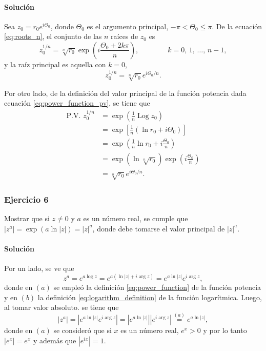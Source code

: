 \documentclass[a4paper]{report}
\DeclareMathOperator{\Log}{Log}
\begin{document}
\paragraph{Solución} Sea \(z_0=r_0e^{i\Theta_0}\), donde \(\Theta_0\) es el argumento principal, \(-\pi<\Theta_0\leq\pi\). De la ecuación \ref{eq:roots_n}, el conjunto de las \(n\) raíces de \(z_0\) es
\[
 z_0^{1/n}=\sqrt[n]{r_0}\exp\left(i\frac{\Theta_0+2k\pi}{n}\right),
 \qquad\qquad k=0,\,1,\,\dots,\,n-1,
\]
y la raíz principal es aquella con \(k=0\),
\[
 z_0^{1/n}=\sqrt[n]{r_0}e^{i\Theta_0/n}.
\]

Por otro lado, de la definición del valor principal de la función potencia dada ecuación \ref{eq:power_function_pv}, se tiene que
\begin{align*}
 \textrm{P.V. }z_0^{1/n}&=\exp\left(\frac{1}{n}\Log z_0\right)\\
  &=\exp\left[\frac{1}{n}(\ln r_0+i\Theta_0)\right]\\
  &=\exp\left(\frac{1}{n}\ln r_0+i\frac{\Theta_0}{n}\right)\\
  &=\exp\left(\ln\sqrt[n]{r_0}\right)\exp\left(i\frac{\Theta_0}{n}\right)\\
  &=\sqrt[n]{r_0}e^{i\Theta_0/n}.
\end{align*}

\subsubsection{Ejercicio 6}

Mostrar que si \(z\neq0\) y \(a\) es un número real, se cumple que \(|z^a|=\exp(a\ln|z|)=|z|^a\), donde debe tomarse el valor principal de \(|z|^a\).

\paragraph{Solución} Por un lado, se ve que 
\[
 z^a=e^{a\log z}=e^{a(\ln|z|+i\arg z)}=e^{a\ln|z|}e^{i\arg z},
\]
donde en \((a)\) se empleó la definición \ref{eq:power_function} de la función potencia y en \((b)\) la definición \ref{eq:logarithm_definition} de la función logarítmica. Luego, al tomar valor absoluto. se tiene que 
\begin{equation}\label{eq:exercise_36_06_1}
  |z^a|=|e^{a\ln|z|}e^{i\arg z}|=|e^{a\ln|z|}||e^{i\arg z}|\overset{(a)}{=}e^{a\ln|z|},
\end{equation}
donde en \((a)\) se consideró que si \(x\) es un número real, \(e^x>0\) y por lo tanto \(|e^x|=e^x\) y además que \(|e^{ix}|=1\).
\end{document}
